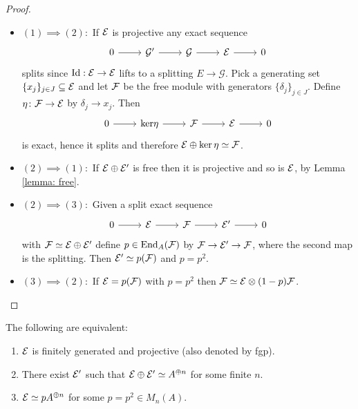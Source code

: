 \begin{proof}\noindent 
 \begin{itemize}
 \item $(1)\implies(2):$ If $\mathcal{E}$ is projective any exact sequence $$\begin{tikzcd}0\arrow[r] & \mathcal G'\arrow[r] & \mathcal G \arrow[r] & \E\arrow[r] & 0 \end{tikzcd}$$ splits since $\mathrm{Id}:\mathcal{E}\to\mathcal{E}$ lifts to a splitting $E\to\mathcal G$. Pick a generating set $\{x_j\}_{j\in J}\subseteq\mathcal{E}$ and let $\mathcal{F}$ be the free module with generators $\{\delta_j\}_{j\in J}$. Define $\eta\colon\mathcal{F}\to\mathcal{E}$ by $\delta_j\to x_j$. Then $$\begin{tikzcd}0\arrow[r] & \mathcal \ker\eta\arrow[r] & \mathcal \F \arrow[r] & \E\arrow[r] & 0 \end{tikzcd}$$ is exact, hence it splits and therefore $\mathcal{E}\oplus\ker\eta\simeq\mathcal{F}$.
 \item $(2)\implies(1):$ If $\mathcal{E}\oplus\mathcal{E}'$ is free then it is projective and so is $\mathcal{E}$, by Lemma \eqref{lemma: free}.
 \item $(2)\implies(3):$ Given a split exact sequence $$\begin{tikzcd}0\arrow[r] & \mathcal \E\arrow[r] & \mathcal \F \arrow[r] & \E'\arrow[r] & 0 \end{tikzcd}$$ with $\mathcal{F}\simeq\mathcal{E}\oplus\mathcal{E}'$ define $p\in\mathrm{End}_A(\mathcal{F})$ by $\mathcal{F}\to\mathcal{E}'\to\mathcal{F}$, where the second map is the splitting. Then $\mathcal{E}'\simeq p(\mathcal{F})$ and $p=p^2$.
 \item $(3)\implies(2):$ If $\mathcal{E}=p(\mathcal{F})$ with $p=p^2$ then $\mathcal{F}\simeq\mathcal{E}\otimes(1-p)\mathcal{F}$.
 \end{itemize}
\end{proof}

\begin{corollary}\label{corollary: fgp}
 The following are equivalent:
 \begin{enumerate}
  \item $\mathcal{E}$ is finitely generated and projective (also denoted by fgp).
  \item There exist $\mathcal{E}'$ such that $\mathcal{E}\oplus\mathcal{E}'\simeq A^{\oplus n}$ for some finite $n$.
  \item $\mathcal{E}\simeq pA^{\oplus n}$ for some $p=p^2\in M_n(A)$.
 \end{enumerate}
\end{corollary}

